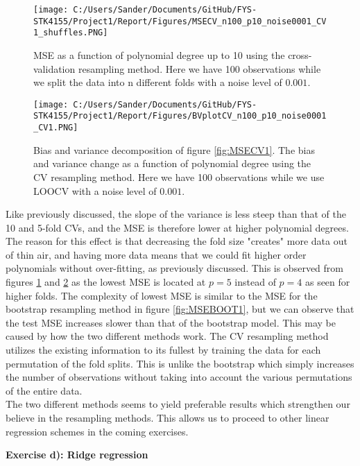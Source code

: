 \documentclass[12pt,a4paper]{article}
\begin{document}
\begin{figure}[H]
\centering
\texttt{[image: C:/Users/Sander/Documents/GitHub/FYS-STK4155/Project1/Report/Figures/MSECV\_n100\_p10\_noise0001\_CV1\_shuffles.PNG]}
\caption{\label{fig:MSECV3} MSE as a function of polynomial degree up to 10 using the cross-validation resampling method. Here we have 100 observations while we split the data into n different folds with a noise level of $0.001$.}
\end{figure}

\begin{figure}[H]
\centering
\texttt{[image: C:/Users/Sander/Documents/GitHub/FYS-STK4155/Project1/Report/Figures/BVplotCV\_n100\_p10\_noise0001\_CV1.PNG]}
\caption{\label{fig:BVCV3} Bias and variance decomposition of figure \ref{fig:MSECV1}. The bias and variance change as a function of polynomial degree using the CV resampling method. Here we have 100 observations while we use LOOCV with a noise level of $0.001$.}
\end{figure}

\noindent Like previously discussed, the slope of the variance is less steep than that of the 10 and 5-fold CVs, and the MSE is therefore lower at higher polynomial degrees. The reason for this effect is that decreasing the fold size "creates" more data out of thin air, and having more data means that we could fit higher order polynomials without over-fitting, as previously discussed. This is observed from figures \ref{fig:MSECV3} and \ref{fig:BVCV3} as the lowest MSE is located at $p = 5$ instead of $p = 4$ as seen for higher folds. The complexity of lowest MSE is similar to the MSE for the bootstrap resampling method in figure \ref{fig:MSEBOOT1}, but we can observe that the test MSE increases slower than that of the bootstrap model. This may be caused by how the two different methods work. The CV resampling method utilizes the existing information to its fullest by training the data for each permutation of the fold splits. This is unlike the bootstrap which simply increases the number of observations without taking into account the various permutations of the entire data.
\\
The two different methods seems to yield preferable results which strengthen our believe in the resampling methods. This allows us to proceed to other linear regression schemes in the coming exercises.

\newpage

\begin{center}
\Large{\textbf{Exercise d): Ridge regression}}
\end{center}
\end{document}

